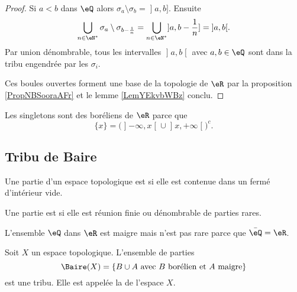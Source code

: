 \begin{proof}
    Si \( a<b\) dans \( \eQ\) alors \( \sigma_a\setminus\sigma_b=\mathopen] a , b \mathclose]\). Ensuite 
    \begin{equation}
        \bigcup_{n\in \eN^*}\sigma_a\setminus\sigma_{b-\frac{1}{ n }}=\bigcup_{n\in \eN^*}\mathopen] a , b-\frac{1}{ n } \mathclose]=\mathopen] a , b \mathclose[.
    \end{equation}
    Par union dénombrable, tous les intervalles \( \mathopen] a , b \mathclose[\) avec \( a,b\in \eQ\) sont dans la tribu engendrée par les \( \sigma_i\).

        Ces boules ouvertes forment une base de la topologie de \( \eR\) par la proposition \ref{PropNBSooraAFr} et le lemme \ref{LemYEkvbWBz} conclu.
\end{proof}

\begin{example}
    Les singletons sont des boréliens de \( \eR\) parce que 
    \begin{equation}
    \{ x \}=\Big( \mathopen] -\infty , x \mathclose[\cup\mathopen] x , +\infty \mathclose[ \Big)^c.
    \end{equation}
\end{example}

\subsection{Tribu de Baire}

\begin{definition}
    Une partie d'un espace topologique est  si elle est contenue dans un fermé d'intérieur vide.

    Une partie est  si elle est réunion finie ou dénombrable de parties rares.
\end{definition}

\begin{example}
    L'ensemble \( \eQ\) dans \( \eR\) est maigre mais n'est pas rare parce que \( \bar\eQ=\eR\).
\end{example}

\begin{proposition}
    Soit \( X\) un espace topologique. L'ensemble de parties
    \begin{equation}
        \Baire(X)=\{ B\cup A\text{ avec \( B\) borélien et \( A\) maigre} \}
    \end{equation}
    est une tribu. Elle est appelée la  de l'espace \( X\).
\end{proposition}

